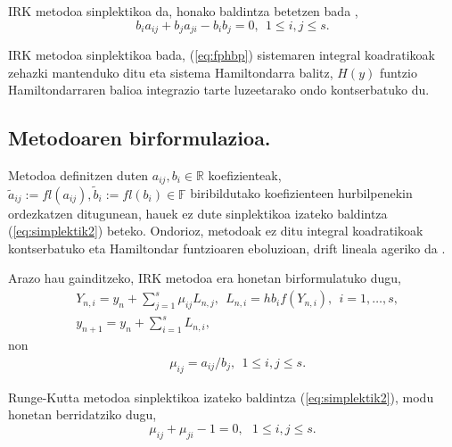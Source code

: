IRK metodoa sinplektikoa da, honako baldintza betetzen bada  \cite{JMSanz-Serna1994} ,
\begin{equation}
\label{eq:simplektik2}
b_{i}a_{ij}+b_{j}a_{ji}-b_{i}b_{j}=0, \ \ 1 \leqslant i,j \leqslant s.
\end{equation}   

IRK metodoa sinplektikoa bada, (\ref{eq:fphbp}) sistemaren integral koadratikoak zehazki mantenduko ditu eta sistema Hamiltondarra balitz, $H(y)$ funtzio Hamiltondarraren balioa integrazio tarte luzeetarako ondo kontserbatuko du.

\subsection{Metodoaren birformulazioa.}

Metodoa definitzen duten $a_{ij},b_i  \in \mathbb{R}$ koefizienteak, $\tilde a_{ij}:=fl(a_{ij}),\tilde b_i:=fl(b_i) \in \mathbb{F}$ biribildutako koefizienteen hurbilpenekin ordezkatzen ditugunean, hauek ez dute sinplektikoa izateko baldintza (\ref{eq:simplektik2}) beteko. Ondorioz, metodoak ez ditu integral koadratikoak kontserbatuko eta Hamiltondar funtzioaren eboluzioan, drift lineala ageriko da \cite{JMSanz-Serna1994}.    
  
Arazo hau gainditzeko, IRK metodoa era honetan birformulatuko dugu,
\begin{align}
\label{eq:irk1}
&Y_{n,i}=y_n+ \sum\limits_{j=1}^{s} \mu_{ij} L_{n,j},  \ \ L_{n,i}=hb_if(Y_{n,i}), \ \ i=1,\dots,s,\\
\label{eq:irk2}
&y_{n+1}=y_n+\sum\limits_{i=1}^{s} L_{n,i},
\end{align}
non 
\begin{align*}
&\mu_{ij}=a_{ij}/{b_j}, \ \ 1 \leqslant i,j \leqslant s.
\end{align*}

Runge-Kutta metodoa sinplektikoa izateko baldintza (\ref{eq:simplektik2}), modu honetan berridatziko dugu,
\begin{equation}
\label{eq:sinplekmij}
\mu_{ij}+\mu_{ji}-1=0, \ \ \ 1 \leqslant i,j \leqslant s.
\end{equation}
 
